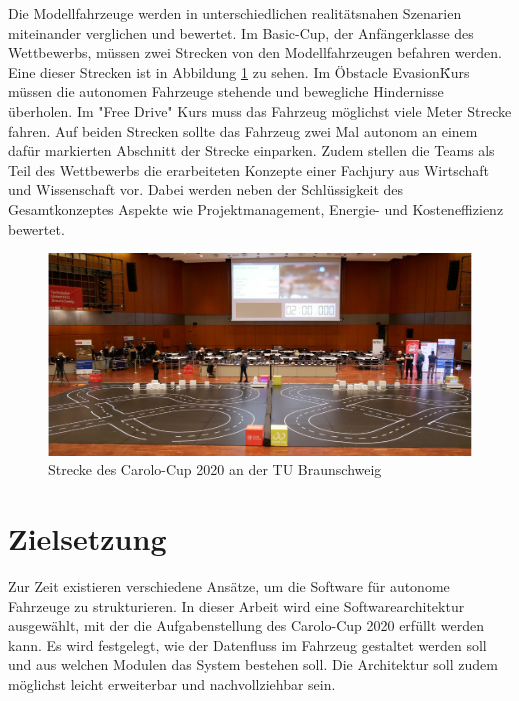 Die Modellfahrzeuge werden in unterschiedlichen realitätsnahen Szenarien miteinander verglichen und bewertet. Im Basic-Cup, der Anfängerklasse des Wettbewerbs, müssen zwei Strecken von den Modellfahrzeugen befahren werden. Eine dieser Strecken ist in Abbildung \ref{EIN:FOT} zu sehen. Im \"Obstacle Evasion\" Kurs müssen die autonomen Fahrzeuge stehende und bewegliche Hindernisse überholen. Im "Free Drive" Kurs muss das Fahrzeug möglichst viele Meter Strecke fahren. Auf beiden Strecken sollte das Fahrzeug zwei Mal autonom an einem dafür markierten Abschnitt der Strecke einparken. Zudem stellen die Teams als Teil des Wettbewerbs die erarbeiteten Konzepte einer Fachjury aus Wirtschaft und Wissenschaft vor. Dabei werden neben der Schlüssigkeit des Gesamtkonzeptes Aspekte wie Projektmanagement, Energie- und Kosteneffizienz bewertet. 
\FloatBarrier
\begin{figure}[h]
  \centering
  \includegraphics[width=\textwidth]{images/Einleitung/Carolocup.JPG}
  \caption[Strecke des Carolo-Cup 2020 an der TU Braunschweig]{Strecke des Carolo-Cup 2020 an der TU Braunschweig}
  \label{EIN:FOT}
\end{figure}
\FloatBarrier

\section{Zielsetzung}

Zur Zeit existieren verschiedene Ansätze, um die Software für autonome Fahrzeuge zu strukturieren. In dieser Arbeit wird eine Softwarearchitektur ausgewählt, mit der die Aufgabenstellung des Carolo-Cup 2020 erfüllt werden kann. Es wird festgelegt, wie der Datenfluss im Fahrzeug gestaltet werden soll und aus welchen Modulen das System bestehen soll. Die Architektur soll zudem möglichst leicht erweiterbar und nachvollziehbar sein.

